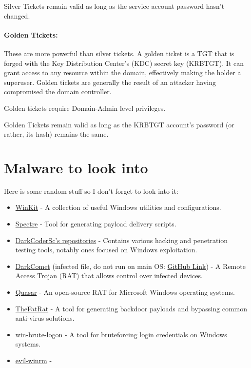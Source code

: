 \documentclass{article}
\begin{document}
Silver Tickets remain valid as long as the service account password hasn't changed.

\paragraph{Golden Tickets:}
These are more powerful than silver tickets. 
A golden ticket is a TGT that is forged with the Key Distribution Center’s 
(KDC) secret key (KRBTGT). It can grant access to any resource within the domain,
 effectively making the holder a superuser. Golden tickets are generally the
 result of an attacker having compromised the domain controller.

 Golden tickets require Domain-Admin level privileges.

Golden Tickets remain valid as long as the KRBTGT account's password (or rather, its hash) remains the same.

\section{Malware to look into}
Here is some random stuff so I don't forget to look into it:
\begin{itemize}
    \item \href{https://github.com/0x44F/WinKit}{WinKit} - A collection of useful Windows utilities and configurations.
    \item \href{https://github.com/D4stiny/spectre}{Spectre} - Tool for generating payload delivery scripts.
    \item \href{https://github.com/DarkCoderSc?tab=repositories}{DarkCoderSc's repositories} - Contains various hacking and penetration testing tools, notably ones focused on Windows exploitation.
    \item \href{https://en.wikipedia.org/wiki/DarkComet}{DarkComet} (infected file, do not run on main OS: \href{https://github.com/zxo2004/DarkComet-RAT-5.3.1}{GitHub Link}) - A Remote Access Trojan (RAT) that allows control over infected devices.
    \item \href{https://github.com/quasar/Quasar}{Quasar} - An open-source RAT for Microsoft Windows operating systems.
    \item \href{https://github.com/screetsec/TheFatRat}{TheFatRat} - A tool for generating backdoor payloads and bypassing common anti-virus solutions.
    \item \href{https://github.com/DarkCoderSc/win-brute-logon}{win-brute-logon} - A tool for bruteforcing login credentials on Windows systems.
    \item \href{https://github.com/Hackplayers/evil-winrm}{evil-winrm} - 
\end{itemize}
\end{document}
